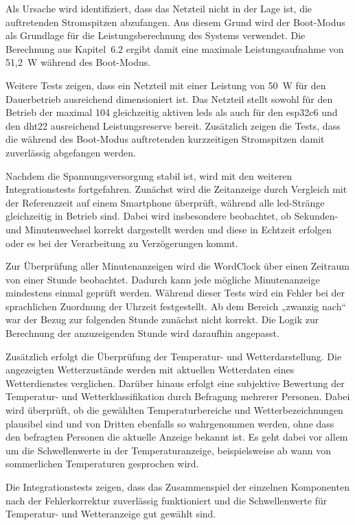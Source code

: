 Als Ursache wird identifiziert, dass das Netzteil nicht in der Lage ist, die auftretenden Stromspitzen abzufangen.  
Aus diesem Grund wird der Boot-Modus als Grundlage für die Leistungsberechnung des Systems verwendet.  
Die Berechnung aus Kapitel~6.2 ergibt damit eine maximale Leistungsaufnahme von 51{,}2~W während des Boot-Modus.  

Weitere Tests zeigen, dass ein Netzteil mit einer Leistung von 50~W für den Dauerbetrieb ausreichend dimensioniert ist.  
Das Netzteil stellt sowohl für den Betrieb der maximal 104 gleichzeitig aktiven \gls{led}s als auch für den \gls{esp32c6} und den \gls{dht22} ausreichend Leistungsreserve bereit.  
Zusätzlich zeigen die Tests, dass die während des Boot-Modus auftretenden kurzzeitigen Stromspitzen damit zuverlässig abgefangen werden.  

Nachdem die Spannungsversorgung stabil ist, wird mit den weiteren Integrationstests fortgefahren.  
Zunächst wird die Zeitanzeige durch Vergleich mit der Referenzzeit auf einem Smartphone überprüft, während alle \gls{led}-Stränge gleichzeitig in Betrieb sind.  
Dabei wird insbesondere beobachtet, ob Sekunden- und Minutenwechsel korrekt dargestellt werden und diese in Echtzeit erfolgen oder es bei der Verarbeitung zu Verzögerungen kommt.  

Zur Überprüfung aller Minutenanzeigen wird die WordClock über einen Zeitraum von einer Stunde beobachtet.  
Dadurch kann jede mögliche Minutenanzeige mindestens einmal geprüft werden.  
Während dieser Tests wird ein Fehler bei der sprachlichen Zuordnung der Uhrzeit festgestellt.  
Ab dem Bereich „zwanzig nach“ war der Bezug zur folgenden Stunde zunächst nicht korrekt.  
Die Logik zur Berechnung der anzuzeigenden Stunde wird daraufhin angepasst.  

Zusätzlich erfolgt die Überprüfung der Temperatur- und Wetterdarstellung.  
Die angezeigten Wetterzustände werden mit aktuellen Wetterdaten eines Wetterdienstes verglichen.  
Darüber hinaus erfolgt eine subjektive Bewertung der Temperatur- und Wetterklassifikation durch Befragung mehrerer Personen.  
Dabei wird überprüft, ob die gewählten Temperaturbereiche und Wetterbezeichnungen plausibel sind und von Dritten ebenfalls so wahrgenommen werden, ohne dass den befragten Personen die aktuelle Anzeige bekannt ist.  
Es geht dabei vor allem um die Schwellenwerte in der Temperaturanzeige, beispielsweise ab wann von sommerlichen Temperaturen gesprochen wird.  

Die Integrationstests zeigen, dass das Zusammenspiel der einzelnen Komponenten nach der Fehlerkorrektur zuverlässig funktioniert und die Schwellenwerte für Temperatur- und Wetteranzeige gut gewählt sind.  